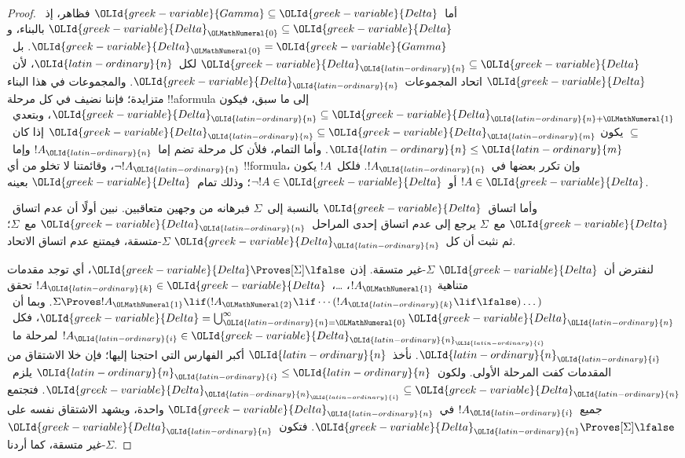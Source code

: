 \documentclass[../../../include/open-logic-section]{subfiles}
\begin{document}
\begin{proof}
أما~${\OLId{greek-variable}{Gamma}} \subseteq {\OLId{greek-variable}{Delta}}$ فظاهر، إذ~${\OLId{greek-variable}{Delta}}_{\OLMathNumeral{0}} \subseteq
{\OLId{greek-variable}{Delta}}$ بالبناء، و${\OLId{greek-variable}{Delta}}_{\OLMathNumeral{0}} = {\OLId{greek-variable}{Gamma}}$.
بل~${\OLId{greek-variable}{Delta}}_{\OLId{latin-ordinary}{n}} \subseteq {\OLId{greek-variable}{Delta}}$ لكل~${\OLId{latin-ordinary}{n}}$، لأن~${\OLId{greek-variable}{Delta}}$ اتحاد المجموعات~${\OLId{greek-variable}{Delta}}_{\OLId{latin-ordinary}{n}}$.
والمجموعات في هذا البناء متزايدة؛ فإننا نضيف في كل مرحلة !!a{formula}
إلى ما سبق، فيكون ${\OLId{greek-variable}{Delta}}_{\OLId{latin-ordinary}{n}} \subseteq {\OLId{greek-variable}{Delta}}_{{\OLId{latin-ordinary}{n}}+{\OLMathNumeral{1}}}$،
وبتعدي~$\subseteq$ يكون ${\OLId{greek-variable}{Delta}}_{\OLId{latin-ordinary}{n}} \subseteq {\OLId{greek-variable}{Delta}}_{\OLId{latin-ordinary}{m}}$ إذا كان~${\OLId{latin-ordinary}{n}} \le {\OLId{latin-ordinary}{m}}$.
وأما التمام، فلأن كل مرحلة تضم إما~$!A_{\OLId{latin-ordinary}{n}}$ وإما~$\lnot !A_{\OLId{latin-ordinary}{n}}$،
وقائمتنا لا تخلو من أي !!{formula}، وإن تكرر بعضها في~$!A_{\OLId{latin-ordinary}{n}}$.
فلكل~$!A$ يكون $!A \in {\OLId{greek-variable}{Delta}}$ أو~$\lnot !A \in {\OLId{greek-variable}{Delta}}$؛
وذلك تمام~${\OLId{greek-variable}{Delta}}$ بعينه.

وأما اتساق~${\OLId{greek-variable}{Delta}}$ بالنسبة إلى~$\Sigma$ فبرهانه من وجهين متعاقبين.
نبين أولًا أن عدم اتساق~${\OLId{greek-variable}{Delta}}$ مع~$\Sigma$ يرجع إلى عدم اتساق
إحدى المراحل~${\OLId{greek-variable}{Delta}}_{\OLId{latin-ordinary}{n}}$ مع~$\Sigma$؛ ثم نثبت أن كل~${\OLId{greek-variable}{Delta}}_{\OLId{latin-ordinary}{n}}$
$\Sigma$-متسقة، فيمتنع عدم اتساق الاتحاد.

لنفترض أن~${\OLId{greek-variable}{Delta}}$ $\Sigma$-غير متسقة.
إذن ${\OLId{greek-variable}{Delta}} \Proves[\Sigma] \lfalse$، أي توجد مقدمات متناهية
$!A_{\OLMathNumeral{1}}$، \dots،~$!A_{\OLId{latin-ordinary}{k}} \in {\OLId{greek-variable}{Delta}}$ تحقق
$\Sigma \Proves !A_{\OLMathNumeral{1}} \lif (!A_{\OLMathNumeral{2}} \lif \cdots (!A_{\OLId{latin-ordinary}{k}} \lif
\lfalse)\dots)$. وبما أن~${\OLId{greek-variable}{Delta}} = \bigcup_{{\OLId{latin-ordinary}{n}}={\OLMathNumeral{0}}}^\infty {\OLId{greek-variable}{Delta}}_{\OLId{latin-ordinary}{n}}$،
فكل~$!A_{\OLId{latin-ordinary}{i}} \in {\OLId{greek-variable}{Delta}}_{{\OLId{latin-ordinary}{n}}_{\OLId{latin-ordinary}{i}}}$ لمرحلة ما~${\OLId{latin-ordinary}{n}}_{\OLId{latin-ordinary}{i}}$.
نأخذ~${\OLId{latin-ordinary}{n}}$ أكبر الفهارس التي احتجنا إليها؛ فإن خلا الاشتقاق من المقدمات
كفت المرحلة الأولى. ولكون~${\OLId{latin-ordinary}{n}}_{\OLId{latin-ordinary}{i}} \le {\OLId{latin-ordinary}{n}}$ يلزم~${\OLId{greek-variable}{Delta}}_{{\OLId{latin-ordinary}{n}}_{\OLId{latin-ordinary}{i}}} \subseteq {\OLId{greek-variable}{Delta}}_{\OLId{latin-ordinary}{n}}$.
فتجتمع جميع~$!A_{\OLId{latin-ordinary}{i}}$ في~${\OLId{greek-variable}{Delta}}_{\OLId{latin-ordinary}{n}}$ واحدة،
ويشهد الاشتقاق نفسه على ${\OLId{greek-variable}{Delta}}_{\OLId{latin-ordinary}{n}} \Proves[\Sigma] \lfalse$.
فتكون~${\OLId{greek-variable}{Delta}}_{\OLId{latin-ordinary}{n}}$ $\Sigma$-غير متسقة، كما أردنا.


\end{proof}
\end{document}

